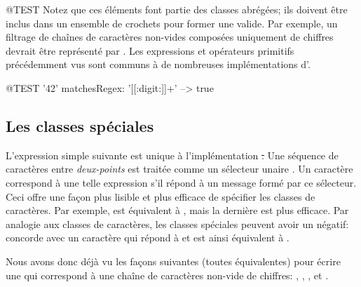 \documentclass[a4paper,10pt,twoside]{book}
\begin{document}
\begin{code}{@TEST}
Notez que ces éléments font partie des classes abrégées; ils doivent
être inclus dans un ensemble de crochets pour former une \expreg
valide. Par exemple, un filtrage de chaînes de caractères non-vides composées
uniquement de chiffres devrait être représenté par \ct{[[:digit:]]+}.
Les expressions et opérateurs primitifs précédemment vus sont communs
à de nombreuses implémentations d'\expregs.

\begin{code}{@TEST}
'42' matchesRegex: '[[:digit:]]+' --> true
\end{code}

\subsection{Les classes spéciales}
L'expression simple suivante est unique à l'implémentation \st. Une
séquence de caractères entre \emph{deux-points} est traitée comme un
sélecteur unaire .
Un caractère correspond à une telle expression s'il répond 
à un message formé par ce sélecteur.
Ceci offre une façon plus lisible et plus efficace de spécifier les
classes de caractères. Par exemple, \ct{[0-9]} est équivalent à
, mais la dernière est plus efficace. Par analogie aux
classes de caractères, les classes spéciales peuvent avoir un négatif:
 concorde avec un caractère qui répond  à
  et est ainsi équivalent à  \ct{[CARET0-9]}.

Nous avons donc déjà vu les façons suivantes (toutes équivalentes) pour écrire une \expreg qui
correspond à une chaîne de caractères non-vide de chiffres:
\ct{[0-9]+}, \ct{\d+}, \ct{[\d]+}, \ct{[[:digit:]]+} et .


\end{code}
\end{document}
